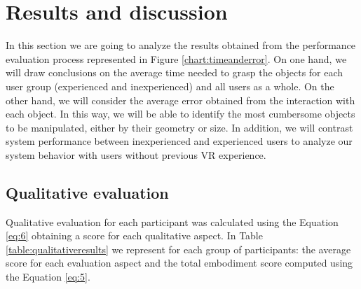 \section{Results and discussion}
\label{sec:results}

In this section we are going to analyze the results obtained from the performance evaluation process represented in Figure \ref{chart:timeanderror}. On one hand, we will draw conclusions on the average time needed to grasp the objects for each user group (experienced and inexperienced) and all users as a whole. On the other hand, we will consider the average error obtained from the interaction with each object. In this way, we will be able to identify the most cumbersome objects to be manipulated, either by their geometry or size. In addition, we will contrast system performance between inexperienced and experienced users to analyze our system behavior with users without previous VR experience.


\subsection{Qualitative evaluation}

Qualitative evaluation for each participant was calculated using the Equation \ref{eq:6} obtaining a score for each qualitative aspect. In Table \ref{table:qualitativeresults} we represent for each group of participants: the average score for each evaluation aspect and the total embodiment score computed using the Equation \ref{eq:5}.

\begin{table}
	\caption{Average score for each qualitative aspect of the evaluation and group of participants. Maximum result would be three. Results were obtained using the Equation \ref{eq:6}.}
	\label{table:qualitativeresults}
\end{table}

